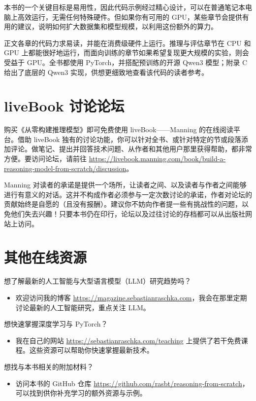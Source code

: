 本书的一个关键目标是易用性，因此代码示例经过精心设计，可以在普通笔记本电脑上高效运行，无需任何特殊硬件。但如果你有可用的 GPU，某些章节会提供有用的建议，说明如何扩大数据集和模型规模，以利用这份额外的算力。

正文各章的代码力求易读，并能在消费级硬件上运行。推理与评估章节在 CPU 和 GPU 上都能很好地运行，而面向训练的章节如果希望复现更大规模的实验，则会受益于 GPU。全书都使用 PyTorch，并搭配预训练的开源 Qwen3 模型；附录 C 给出了底层的 Qwen3 实现，供想更细致地查看该代码的读者参考。

\section*{liveBook 讨论论坛}

购买《从零构建推理模型》即可免费使用 liveBook——Manning 的在线阅读平台。借助 liveBook 独有的讨论功能，你可以针对全书、或针对特定的节或段落添加评论。做笔记、提出并回答技术问题、从作者和其他用户那里获得帮助，都非常方便。要访问论坛，请前往 \href{https://livebook.manning.com/book/build-a-reasoning-model-from-scratch/discussion}{https://livebook.manning.com/book/build-a-reasoning-model-from-scratch/discussion}。

Manning 对读者的承诺是提供一个场所，让读者之间、以及读者与作者之间能够进行有意义的对话。这并不构成作者必须参与一定次数讨论的承诺，作者对论坛的贡献始终是自愿的（且没有报酬）。建议你不妨向作者提一些有挑战性的问题，以免他们失去兴趣！只要本书仍在印行，论坛以及过往讨论的存档都可以从出版社网站上访问。

\section*{其他在线资源}

想了解最新的人工智能与大型语言模型（LLM）研究趋势吗？

\begin{itemize}
\item 欢迎访问我的博客 \href{https://magazine.sebastianraschka.com}{https://magazine.sebastianraschka.com}，我会在那里定期讨论最新的人工智能研究，重点关注 LLM。
\end{itemize}

想快速掌握深度学习与 PyTorch？

\begin{itemize}
\item 我在自己的网站 \href{https://sebastianraschka.com/teaching}{https://sebastianraschka.com/teaching} 上提供了若干免费课程。这些资源可以帮助你快速掌握最新技术。
\end{itemize}

想找与本书相关的附加材料？

\begin{itemize}
\item 访问本书的 GitHub 仓库 \href{https://github.com/rasbt/reasoning-from-scratch}{https://github.com/rasbt/reasoning-from-scratch}，可以找到供你补充学习的额外资源与示例。
\end{itemize}

